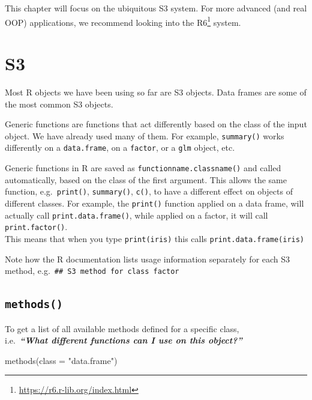 \documentclass[
]{book}
\newenvironment{Shaded}{\begin{snugshade}}{\end{snugshade}}
\newcommand{\AttributeTok}[1]{\textcolor[rgb]{0.77,0.63,0.00}{#1}}
\newcommand{\FunctionTok}[1]{\textcolor[rgb]{0.00,0.00,0.00}{#1}}
\newcommand{\NormalTok}[1]{#1}
\newcommand{\StringTok}[1]{\textcolor[rgb]{0.31,0.60,0.02}{#1}}
\renewcommand{\href}[2]{#2\footnote{\url{#1}}}
\begin{document}
This chapter will focus on the ubiquitous S3 system. For more advanced (and real OOP) applications, we recommend looking into the \href{https://r6.r-lib.org/index.html}{R6} system.

\hypertarget{s3}{%
\section{S3}\label{s3}}

Most R objects we have been using so far are S3 objects. Data frames are some of the most common S3 objects.

Generic functions are functions that act differently based on the class of the input object. We have already used many of them. For example, \texttt{summary()} works differently on a \texttt{data.frame}, on a \texttt{factor}, or a \texttt{glm} object, etc.

Generic functions in R are saved as \texttt{functionname.classname()} and called automatically, based on the class of the first argument. This allows the same function, e.g.~\texttt{print()}, \texttt{summary()}, \texttt{c()}, to have a different effect on objects of different classes.
For example, the \texttt{print()} function applied on a data frame, will actually call \texttt{print.data.frame()}, while applied on a factor, it will call \texttt{print.factor()}.\\
This means that when you type \texttt{print(iris)} this calls \texttt{print.data.frame(iris)}

Note how the R documentation lists usage information separately for each S3 method, e.g.~\texttt{\#\#\ S3\ method\ for\ class\ \textquotesingle{}factor\textquotesingle{}}

\hypertarget{s3methods}{%
\subsection{\texorpdfstring{\texttt{methods()}}{methods()}}\label{s3methods}}

To get a list of all available methods defined for a specific class,\\
i.e.~\textbf{\emph{``What different functions can I use on this object?''}}

\begin{Shaded}
\begin{Highlighting}[]
\FunctionTok{methods}\NormalTok{(}\AttributeTok{class =} \StringTok{"data.frame"}\NormalTok{)}
\end{Highlighting}
\end{Shaded}
\end{document}
